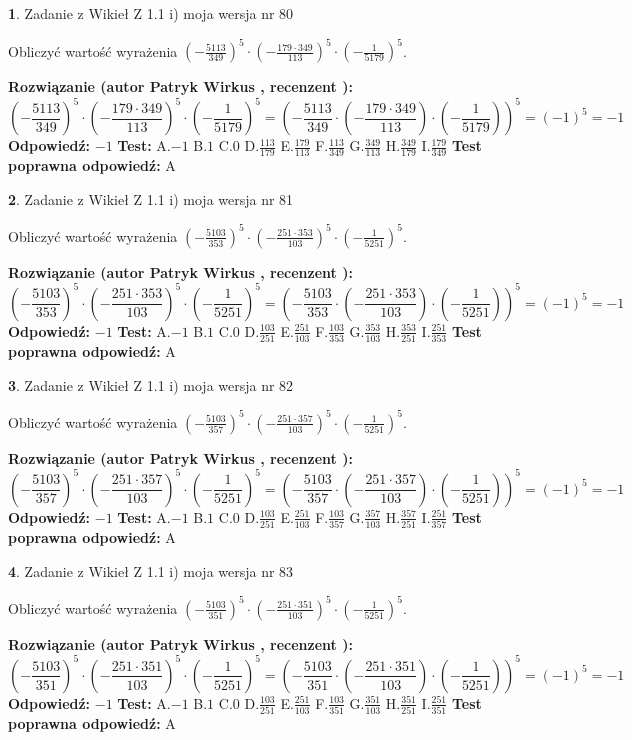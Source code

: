 \documentclass[12pt, a4paper]{article}
\theoremstyle{definition} %
\newtheorem{zad}{}
\newcommand{\zadStart}[1]{\begin{zad}#1\newline}
\newcommand{\zadStop}{\end{zad}}
\newcommand{\rozwStart}[2]{\noindent \textbf{Rozwiązanie (autor #1 , recenzent #2): }\newline}
\newcommand{\rozwStop}{\newline}
\newcommand{\odpStart}{\noindent \textbf{Odpowiedź:}\newline}
\newcommand{\odpStop}{\newline}
\newcommand{\testStart}{\noindent \textbf{Test:}\newline}
\newcommand{\testStop}{\newline}
\newcommand{\kluczStart}{\noindent \textbf{Test poprawna odpowiedź:}\newline}
\newcommand{\kluczStop}{\newline}
\begin{document}
\zadStart{Zadanie z Wikieł Z 1.1 i) moja wersja nr 80}

Obliczyć wartość wyrażenia $(-\frac{5113}{349})^{5} \cdot (-\frac{179 \cdot 349}{113})^{5} \cdot (-\frac{1}{5179})^{5}$.
\zadStop
\rozwStart{Patryk Wirkus}{}
$$(-\frac{5113}{349})^{5} \cdot (-\frac{179 \cdot 349}{113})^{5} \cdot (-\frac{1}{5179})^{5} = (-\frac{5113}{349} \cdot (-\frac{179 \cdot 349}{113}) \cdot (-\frac{1}{5179}))^{5} = (-1)^{5} = -1$$
\rozwStop
\odpStart
$-1$
\odpStop
\testStart
A.$-1$ B.$1$ C.$0$ D.$\frac{113}{179}$ E.$\frac{179}{113}$
F.$\frac{113}{349}$ G.$\frac{349}{113}$
H.$\frac{349}{179}$
I.$\frac{179}{349}$
\testStop
\kluczStart
A
\kluczStop



\zadStart{Zadanie z Wikieł Z 1.1 i) moja wersja nr 81}

Obliczyć wartość wyrażenia $(-\frac{5103}{353})^{5} \cdot (-\frac{251 \cdot 353}{103})^{5} \cdot (-\frac{1}{5251})^{5}$.
\zadStop
\rozwStart{Patryk Wirkus}{}
$$(-\frac{5103}{353})^{5} \cdot (-\frac{251 \cdot 353}{103})^{5} \cdot (-\frac{1}{5251})^{5} = (-\frac{5103}{353} \cdot (-\frac{251 \cdot 353}{103}) \cdot (-\frac{1}{5251}))^{5} = (-1)^{5} = -1$$
\rozwStop
\odpStart
$-1$
\odpStop
\testStart
A.$-1$ B.$1$ C.$0$ D.$\frac{103}{251}$ E.$\frac{251}{103}$
F.$\frac{103}{353}$ G.$\frac{353}{103}$
H.$\frac{353}{251}$
I.$\frac{251}{353}$
\testStop
\kluczStart
A
\kluczStop



\zadStart{Zadanie z Wikieł Z 1.1 i) moja wersja nr 82}

Obliczyć wartość wyrażenia $(-\frac{5103}{357})^{5} \cdot (-\frac{251 \cdot 357}{103})^{5} \cdot (-\frac{1}{5251})^{5}$.
\zadStop
\rozwStart{Patryk Wirkus}{}
$$(-\frac{5103}{357})^{5} \cdot (-\frac{251 \cdot 357}{103})^{5} \cdot (-\frac{1}{5251})^{5} = (-\frac{5103}{357} \cdot (-\frac{251 \cdot 357}{103}) \cdot (-\frac{1}{5251}))^{5} = (-1)^{5} = -1$$
\rozwStop
\odpStart
$-1$
\odpStop
\testStart
A.$-1$ B.$1$ C.$0$ D.$\frac{103}{251}$ E.$\frac{251}{103}$
F.$\frac{103}{357}$ G.$\frac{357}{103}$
H.$\frac{357}{251}$
I.$\frac{251}{357}$
\testStop
\kluczStart
A
\kluczStop



\zadStart{Zadanie z Wikieł Z 1.1 i) moja wersja nr 83}

Obliczyć wartość wyrażenia $(-\frac{5103}{351})^{5} \cdot (-\frac{251 \cdot 351}{103})^{5} \cdot (-\frac{1}{5251})^{5}$.
\zadStop
\rozwStart{Patryk Wirkus}{}
$$(-\frac{5103}{351})^{5} \cdot (-\frac{251 \cdot 351}{103})^{5} \cdot (-\frac{1}{5251})^{5} = (-\frac{5103}{351} \cdot (-\frac{251 \cdot 351}{103}) \cdot (-\frac{1}{5251}))^{5} = (-1)^{5} = -1$$
\rozwStop
\odpStart
$-1$
\odpStop
\testStart
A.$-1$ B.$1$ C.$0$ D.$\frac{103}{251}$ E.$\frac{251}{103}$
F.$\frac{103}{351}$ G.$\frac{351}{103}$
H.$\frac{351}{251}$
I.$\frac{251}{351}$
\testStop
\kluczStart
A
\kluczStop
\end{document}
